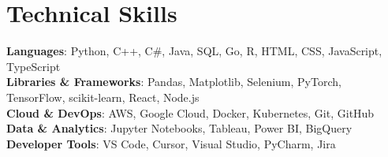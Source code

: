 \documentclass[letterpaper,11pt]{article}
\begin{document}
\section{Technical Skills}
 \begin{itemize}[leftmargin=0.15in, label={}]
    \small{\item{
     \textbf{Languages}{: Python, C++, C\#, Java, SQL, Go, R, HTML, CSS, JavaScript, TypeScript} \\
     \textbf{Libraries \& Frameworks}{: Pandas, Matplotlib, Selenium, PyTorch, TensorFlow, scikit-learn, React, Node.js} \\
     \textbf{Cloud \& DevOps}{: AWS, Google Cloud, Docker, Kubernetes, Git, GitHub} \\
     \textbf{Data \& Analytics}{: Jupyter Notebooks, Tableau, Power BI, BigQuery} \\
     \textbf{Developer Tools}{: VS Code, Cursor, Visual Studio, PyCharm, Jira}
    }}
 \end{itemize}
 
\end{document}
